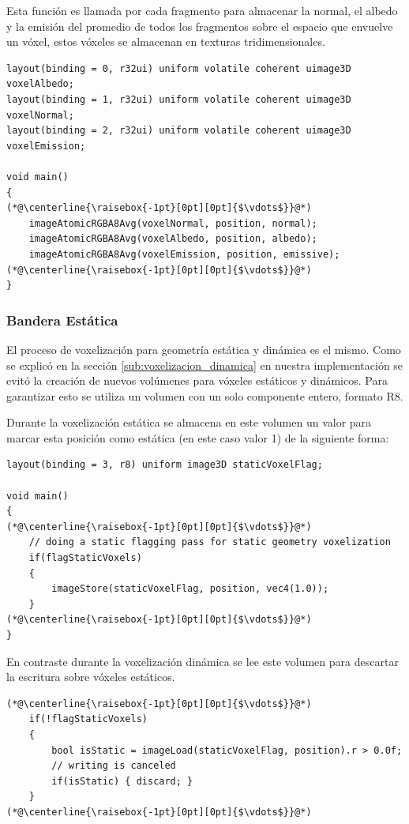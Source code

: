 Esta función es llamada por cada fragmento para almacenar la normal, el albedo y la emisión del promedio de todos los fragmentos sobre el espacio que envuelve un vóxel, estos vóxeles se almacenan en texturas tridimensionales.
\\
\begin{lstlisting}[caption={Composición de fragmentos y vóxeles}, label=Voxelization2]
layout(binding = 0, r32ui) uniform volatile coherent uimage3D voxelAlbedo;
layout(binding = 1, r32ui) uniform volatile coherent uimage3D voxelNormal;
layout(binding = 2, r32ui) uniform volatile coherent uimage3D voxelEmission;

void main()
{
(*@\centerline{\raisebox{-1pt}[0pt][0pt]{$\vdots$}}@*)
	imageAtomicRGBA8Avg(voxelNormal, position, normal);
	imageAtomicRGBA8Avg(voxelAlbedo, position, albedo);
	imageAtomicRGBA8Avg(voxelEmission, position, emissive);
(*@\centerline{\raisebox{-1pt}[0pt][0pt]{$\vdots$}}@*)
}
\end{lstlisting}

\subsubsection{Bandera Estática}
El proceso de voxelización para geometría estática y dinámica es el mismo. Como se explicó en la sección \ref{sub:voxelizacion_dinamica} en nuestra implementación se evitó la creación de nuevos volúmenes para vóxeles estáticos y dinámicos. Para garantizar esto se utiliza un volumen con un solo componente entero, formato R8.

Durante la voxelización estática se almacena en este volumen un valor para marcar esta posición como estática (en este caso valor 1) de la siguiente forma:
\\
\begin{lstlisting}[caption={Escritura de la bandera estática durante voxelización de geometría estática}, label=Voxelization3]
layout(binding = 3, r8) uniform image3D staticVoxelFlag;

void main()
{
(*@\centerline{\raisebox{-1pt}[0pt][0pt]{$\vdots$}}@*)
    // doing a static flagging pass for static geometry voxelization
    if(flagStaticVoxels)
    {
        imageStore(staticVoxelFlag, position, vec4(1.0));
    }
(*@\centerline{\raisebox{-1pt}[0pt][0pt]{$\vdots$}}@*)
}
\end{lstlisting}
En contraste durante la voxelización dinámica se lee este volumen para descartar la escritura sobre vóxeles estáticos.
\\
\begin{lstlisting}[caption={Lectura de la bandera estática durante voxelización de geometría dinámica.}, label=Voxelization4]
(*@\centerline{\raisebox{-1pt}[0pt][0pt]{$\vdots$}}@*)
    if(!flagStaticVoxels)
    {
        bool isStatic = imageLoad(staticVoxelFlag, position).r > 0.0f;
        // writing is canceled
        if(isStatic) { discard; }
    }
(*@\centerline{\raisebox{-1pt}[0pt][0pt]{$\vdots$}}@*)
\end{lstlisting}

